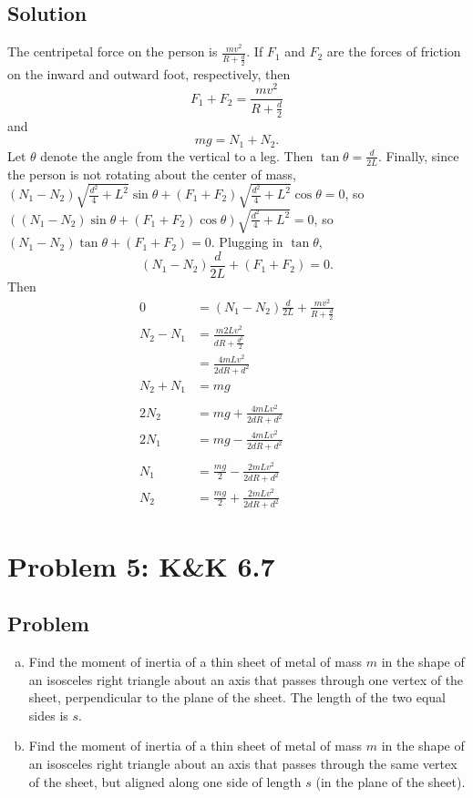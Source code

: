\documentclass[solutions]{esg8012pset}
\begin{document}
\subsection*{Solution}
  The centripetal force on the person is $\frac{m v^2}{R + \frac{d}{2}}$.  If $F_1$ and $F_2$ are the forces of friction on the inward and outward foot, respectively, then $$F_1 + F_2 = \frac{m v^2}{R + \frac{d}{2}}$$ and $$m g = N_1 + N_2.$$  Let $\theta$ denote the angle from the vertical to a leg.  Then $\tan\theta = \frac{d}{2L}$.  Finally, since the person is not rotating about the center of mass, $(N_1 - N_2)\sqrt{\frac{d^2}{4} + L^2}\sin\theta + (F_1 + F_2)\sqrt{\frac{d^2}{4} + L^2}\cos\theta = 0$, so $((N_1 - N_2)\sin\theta + (F_1 + F_2)\cos\theta)\sqrt{\frac{d^2}{4} + L^2} = 0$, so $(N_1 - N_2)\tan\theta + (F_1 + F_2) = 0$.  Plugging in $\tan\theta$, $$(N_1 - N_2)\frac{d}{2L} + (F_1 + F_2) = 0.$$  Then \begin{align*}
  0 & = (N_1 - N_2)\frac{d}{2L} + \frac{m v^2}{R + \frac{d}{2}} \\
  N_2 - N_1 & = \frac{m 2L v^2}{d R + \frac{d^2}{2}} \\
    & = \frac{4 m L v^2}{2 d R + d^2} \\
  N_2 + N_1 & = m g \\
  \\
  2N_2 & = mg + \frac{4 m L v^2}{2 d R + d^2} \\
  2N_1 & = m g - \frac{4 m L v^2}{2 d R + d^2} \\
  \\
  N_1 & = \frac{m g}{2} - \frac{2 m L v^2}{2 d R + d^2} \\
  N_2 & = \frac{m g}{2} + \frac{2 m L v^2}{2 d R + d^2}
  \end{align*}
\section*{Problem 5: K\&K 6.7}
\subsection*{Problem}
  \begin{enumerate}[(a)]
    \item Find the moment of inertia of a thin sheet of metal of mass $m$ in the shape of an isosceles right triangle about an axis that passes through one vertex of the sheet, perpendicular to the plane of the sheet. The length of the two equal sides is $s$.
    \item Find the moment of inertia of a thin sheet of metal of mass $m$ in the shape of an isosceles right triangle about an axis that passes through the same vertex of the sheet, but aligned along one side of length $s$ (in the plane of the sheet).
  \end{enumerate}
\end{document}
